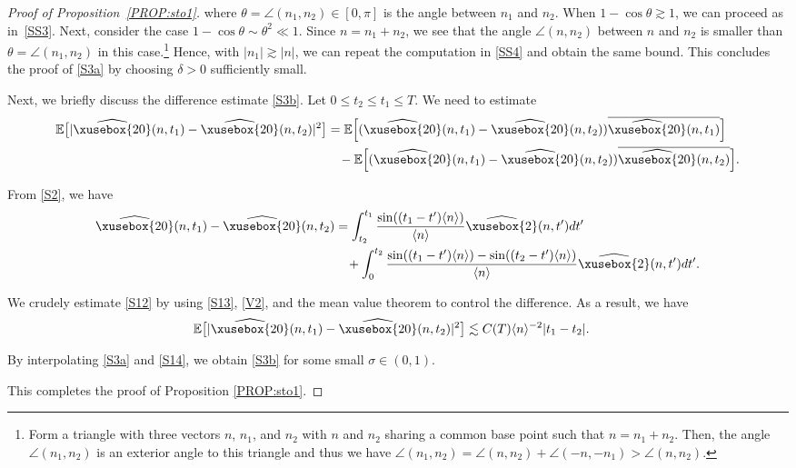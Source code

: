 \documentclass[%
11pt,  reqno]{amsart}
\def\<#1>{\xusebox{#1}}
\newcommand{\1}{\hspace{0.2mm}\text{I}\hspace{0.2mm}}
\newcommand{\noi}{\noindent}
\newcommand{\E}{\mathbb{E}}
\newcommand{\dl}{\delta}
\newcommand{\s}{\sigma}
\newcommand{\ft}{\widehat}
\newcommand{\cj}{\overline}
\newcommand{\ta}{\theta}
\newcommand{\les}{\lesssim}
\newcommand{\ges}{\gtrsim}
\newcommand{\jb}[1]
{\langle #1 \rangle}
\numberwithin{equation}{section}
\numberwithin{theorem}{section}
\begin{document}
\begin{proof}[Proof of Proposition~\ref{PROP:sto1}]
\noi
where $\ta = \angle(n_1, n_2) \in [0, \pi]$ is the angle between $n_1$ and $n_2$.
When  $1 - \cos \ta \ges 1$, 
we can proceed as in~\eqref{SS3}.
Next, consider the case $1 - \cos \ta \sim \ta^2 \ll 1$.
Since $n = n_1 + n_2$, we see that the angle
$\angle (n, n_2)$
between $n$ and $n_2$ is smaller than 
$\ta = \angle(n_1, n_2)$
in this case.\footnote{Form a triangle
with three vectors $n$, $n_1$, and $n_2$ with $n$ and $n_2$ sharing a common base point
such that $n = n_1 + n_2$.
Then, the angle $\angle (n_1, n_2)$ is an exterior angle to this triangle
and thus we have 
$\angle (n_1, n_2) = \angle (n, n_2) + \angle (-n, -n_1) > \angle (n, n_2)$.}
Hence, with $|n_1|\ges |n|$, 
we can repeat the computation in \eqref{SS4} and obtain the same bound.
This concludes the proof of \eqref{S3a} by choosing $\dl>0$ sufficiently small.





\smallskip


Next, we briefly discuss the difference estimate \eqref{S3b}.
Let $0 \leq t_2 \leq t_1 \leq T$.
We need to estimate
\begin{align}
\E \big[ |\ft{\<20>}(n, t_1) - \ft{\<20>}(n, t_2)|^2\big] 
& = \E \Big[ (\ft{\<20>}(n, t_1) - \ft{\<20>}(n, t_2))\cj{\ft{\<20>}(n, t_1)}\Big]\notag\\
& \hphantom{X}
- \E \Big[ (\ft{\<20>}(n, t_1) - \ft{\<20>}(n, t_2))\cj{\ft{\<20>}(n, t_2)}\Big].
\label{S12}
\end{align}


\noi
From \eqref{S2}, we have
\begin{align}
\ft{\<20>}(n,  t_1) - \ft{\<20>}(n,  t_2)
& =  \int_{t_2}^{t_1} \frac{\sin((t_1 - t') \jb{n})}{\jb{n}}  \ft{\<2>}(n, t')dt'\notag\\
& \hphantom{X}
+ \int_0^{t_2} \frac{\sin((t_1 - t') \jb{n}) - \sin((t_2 - t') \jb{n})}{\jb{n}}  \ft{\<2>}(n, t')dt'.
\label{S13}
\end{align}

\noi
We crudely 
estimate \eqref{S12}
%
by using 
\eqref{S13}, \eqref{V2}, and   
the mean value theorem to control the difference.
As a result, 
we have
\begin{align}
\E \big[ |\ft{\<20>}(n, t_1) - \ft{\<20>}(n, t_2)|^2\big] 
& \les C(T) \jb{n}^{-2} |t_1 - t_2|.
\label{S14}
\end{align}


\noi
By interpolating \eqref{S3a} and \eqref{S14}, 
we obtain \eqref{S3b} for some small $\s \in (0, 1)$.




This completes the proof of Proposition \ref{PROP:sto1}.
\end{proof}
\end{document}
